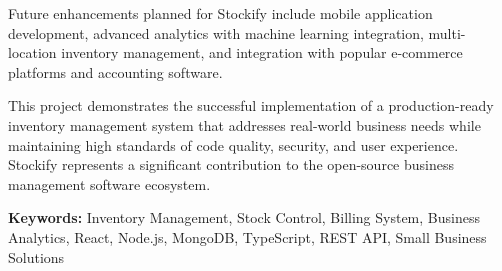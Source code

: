 Future enhancements planned for Stockify include mobile application development, advanced analytics with machine learning integration, multi-location inventory management, and integration with popular e-commerce platforms and accounting software.

This project demonstrates the successful implementation of a production-ready inventory management system that addresses real-world business needs while maintaining high standards of code quality, security, and user experience. Stockify represents a significant contribution to the open-source business management software ecosystem.

\textbf{Keywords:} Inventory Management, Stock Control, Billing System, Business Analytics, React, Node.js, MongoDB, TypeScript, REST API, Small Business Solutions